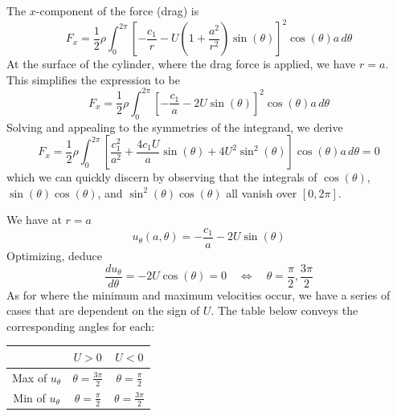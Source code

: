 \documentclass[a4paper]{article}
\begin{document}

The \( x \)-component of the force (drag) is
\[
	F_{x} = \frac{1}{2}\rho \int^{2 \pi}_{0} \!\left[ -\frac{c_{1}}{r} - U \!\left( 1 + \frac{a^{2}}{r^{2}} \right)\sin\!\left(\theta\right) \right]^{2}\cos\!\left(\theta\right)a \, d \theta  
\]
At the surface of the cylinder, where the drag force is applied, we have \( r = a \). This simplifies the expression to be 
\[
	F_{x} = \frac{1}{2}\rho \int^{2 \pi}_{0} \!\left[ -\frac{c_{1}}{a} - 2U \sin\!\left(\theta\right) \right]^{2}\cos\!\left(\theta\right)a \, d \theta  
\]
Solving and appealing to the symmetries of the integrand, we derive
\[
	F_{x} = \frac{1}{2}\rho \int^{2 \pi}_{0} \!\left[ \frac{c^{2}_{1}}{a^{2}} + \frac{4c_{1}U}{a}\sin\!\left(\theta\right) + 4U^{2}\sin^{2}\!\left(\theta\right) \right]\cos\!\left(\theta\right)a \, d \theta = 0
\]
which we can quickly discern by observing that the integrals of \( \cos\!\left(\theta\right) \), \( \sin\!\left(\theta\right)\cos\!\left(\theta\right) \), and \( \sin^{2}\!\left(\theta\right)\cos\!\left(\theta\right) \) all vanish over \( \!\left[ 0,2 \pi \right] \).

\vspace{12pt}


We have at \( r = a \)
\[
	u_{\theta}\!\left( a,\theta \right) = -\frac{c_{1}}{a} - 2U \sin\!\left(\theta\right) 
\]
Optimizing, deduce
\[
	\frac{d u_{\theta}}{d \theta} = -2U \cos\!\left(\theta\right) = 0 \quad \iff \quad \theta = \frac{\pi}{2}, \frac{3 \pi}{2} 
\]
As for where the minimum and maximum velocities occur, we have a series of cases that are dependent on the sign of \( U \). The table below conveys the corresponding angles for each:
\begin{center}
	\renewcommand{\arraystretch}{1.8}
	\setlength{\arraycolsep}{10pt}
	\begin{tabular}{|c||c|c|}
		\hline
		\rule[-1.2em]{0pt}{3em}
		& \( U > 0 \) & \( U < 0 \) \\
		\hline\hline
		\rule[-1.2em]{0pt}{3em}
		Max of \( u_{\theta} \) & \( \theta = \displaystyle{\frac{3 \pi}{2}} \) & \( \theta = \displaystyle{\frac{\pi}{2}} \) \\
		\hline
		\rule[-1.2em]{0pt}{3em}
		Min of \( u_{\theta} \) & \( \theta = \displaystyle{\frac{\pi}{2}} \) & \( \theta = \displaystyle{\frac{3 \pi}{2}} \) \\
		\hline
	\end{tabular}
\end{center}
\end{document}
